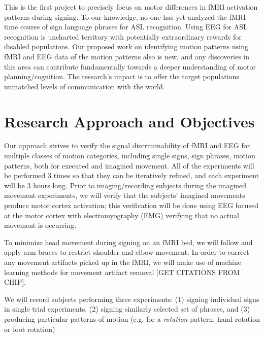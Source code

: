 \documentclass{proposal}
\begin{document}
This is the first project to precisely focus on motor differences in fMRI activation patterns during signing. To our knowledge, no one has yet analyzed the fMRI time course of sign language phrases for ASL recognition. Using EEG for ASL recognition is uncharted territory with potentially extraordinary rewards for disabled populations. Our proposed work on identifying motion patterns using fMRI and EEG data of the motion patterns also is new, and any discoveries in this area can contribute fundamentally towards a deeper understanding of motor planning/cognition. The research's impact is to offer the target populations unmatched levels of communication with the world.


\section{Research Approach and Objectives}

Our approach strives to verify the signal discriminability of fMRI and EEG for multiple classes of motion categories, including single signs, sign phrases, motion patterns, both for executed and imagined movement. All of the experiments will be performed 3 times so that they can be iteratively refined, and each experiment will be 3 hours long. Prior to imaging/recording subjects during the imagined movement experiments, we will verify that the subjects' imagined movements produce motor cortex activation; this verification will be done using EEG focused at the motor cortex with electromyography (EMG) verifying that no actual movement is occurring.

To minimize head movement during signing on an fMRI bed, we will follow \cite{culham2003vgg} and apply arm braces to restrict shoulder and elbow movement. In order to correct any movement artifacts picked up in the fMRI, we will make use of machine learning methods for movement artifact removal [GET CITATIONS FROM CHIP].

We will record subjects performing three experiments: (1) signing individual signs in single trial experiments, (2) signing similarly selected set of phrases, and (3) producing particular patterns of motion (e.g. for a \textit{rotation} pattern, hand rotation or foot rotation)
\end{document}
